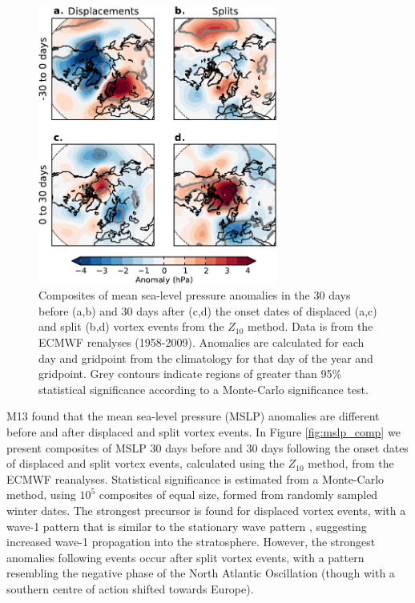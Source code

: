 \begin{figure}
 \centering
 \noindent\includegraphics[width=0.7\textwidth]{figures/chapter-moments/mslp_composites_colbar_crop.pdf}
 \caption[Mean sea-level pressure composites for split and displaced vortex
 events.]{Composites of mean sea-level pressure anomalies in the 30 days before
   (a,b) and 30 days after (c,d) the onset dates of displaced (a,c) and split
   (b,d) vortex events from the $Z_{10}$ method. Data is from the ECMWF
   renalyses (1958-2009). Anomalies are calculated for each day and gridpoint
   from the climatology for that day of the year and gridpoint. Grey contours
   indicate regions of greater than 95\% statistical significance according to a
   Monte-Carlo significance test.}
 \label{Fig3}
\end{figure}


M13 found that the mean sea-level pressure (MSLP) anomalies are different before
and after displaced and split vortex events. In Figure \ref{fig:mslp_comp} we
present composites of MSLP 30 days before and 30 days following the onset dates
of displaced and split vortex events, calculated using the $Z_{10}$ method, from
the ECMWF reanalyses. Statistical significance is estimated from a Monte-Carlo
method, using $10^{5}$ composites of equal size, formed from randomly sampled
winter dates. The strongest precursor is found for displaced vortex events, with
a wave-1 pattern that is similar to the stationary wave pattern
\citep[e.g.][]{Garfinkel2008}, suggesting increased wave-1 propagation into the
stratosphere. However, the strongest anomalies following events occur after
split vortex events, with a pattern resembling the negative phase of the North
Atlantic Oscillation (though with a southern centre of action shifted towards
Europe).

